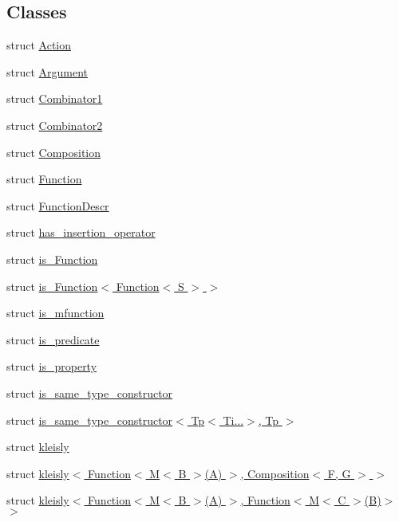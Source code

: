 \subsection*{Classes}
\begin{DoxyCompactItemize}
\item 
struct \hyperlink{structpfq_1_1lang_1_1Action}{Action}
\item 
struct \hyperlink{structpfq_1_1lang_1_1Argument}{Argument}
\item 
struct \hyperlink{structpfq_1_1lang_1_1Combinator1}{Combinator1}
\item 
struct \hyperlink{structpfq_1_1lang_1_1Combinator2}{Combinator2}
\item 
struct \hyperlink{structpfq_1_1lang_1_1Composition}{Composition}
\item 
struct \hyperlink{structpfq_1_1lang_1_1Function}{Function}
\item 
struct \hyperlink{structpfq_1_1lang_1_1FunctionDescr}{Function\+Descr}
\item 
struct \hyperlink{structpfq_1_1lang_1_1has__insertion__operator}{has\+\_\+insertion\+\_\+operator}
\item 
struct \hyperlink{structpfq_1_1lang_1_1is__Function}{is\+\_\+\+Function}
\item 
struct \hyperlink{structpfq_1_1lang_1_1is__Function_3_01Function_3_01S_01_4_01_4}{is\+\_\+\+Function$<$ Function$<$ S $>$ $>$}
\item 
struct \hyperlink{structpfq_1_1lang_1_1is__mfunction}{is\+\_\+mfunction}
\item 
struct \hyperlink{structpfq_1_1lang_1_1is__predicate}{is\+\_\+predicate}
\item 
struct \hyperlink{structpfq_1_1lang_1_1is__property}{is\+\_\+property}
\item 
struct \hyperlink{structpfq_1_1lang_1_1is__same__type__constructor}{is\+\_\+same\+\_\+type\+\_\+constructor}
\item 
struct \hyperlink{structpfq_1_1lang_1_1is__same__type__constructor_3_01Tp_3_01Ti_8_8_8_4_00_01Tp_01_4}{is\+\_\+same\+\_\+type\+\_\+constructor$<$ Tp$<$ Ti...$>$, Tp $>$}
\item 
struct \hyperlink{structpfq_1_1lang_1_1kleisly}{kleisly}
\item 
struct \hyperlink{structpfq_1_1lang_1_1kleisly_3_01Function_3_01M_3_01B_01_4_07A_08_01_4_00_01Composition_3_01F_00_01G_01_4_01_4}{kleisly$<$ Function$<$ M$<$ B $>$(\+A) $>$, Composition$<$ F, G $>$ $>$}
\item 
struct \hyperlink{structpfq_1_1lang_1_1kleisly_3_01Function_3_01M_3_01B_01_4_07A_08_01_4_00_01Function_3_01M_3_01C_01_4_07B_08_4_01_4}{kleisly$<$ Function$<$ M$<$ B $>$(\+A) $>$, Function$<$ M$<$ C $>$(\+B)$>$ $>$}

\end{DoxyCompactItemize}
